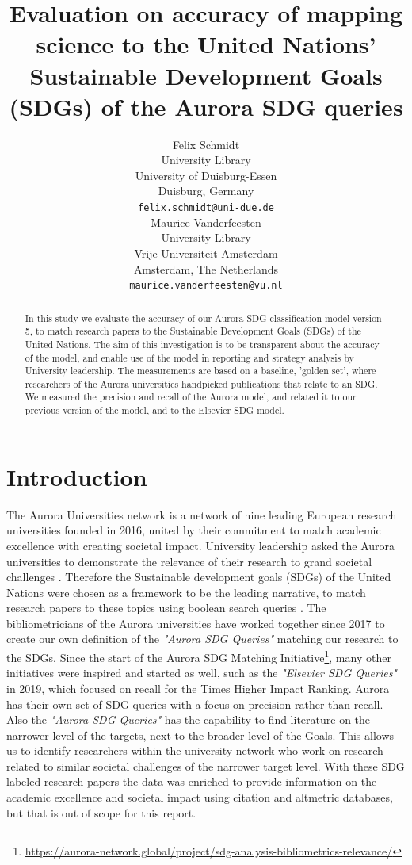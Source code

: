 \documentclass{article}
\title{Evaluation on accuracy of mapping science to the United Nations' Sustainable Development Goals (SDGs) of the Aurora SDG queries}
\author{
  Felix Schmidt \\
  University Library\\
  University of Duisburg-Essen\\
  Duisburg, Germany\\
  \texttt{felix.schmidt@uni-due.de} \\
   \And
Maurice Vanderfeesten \\
  University Library\\
  Vrije Universiteit Amsterdam\\
  Amsterdam, The Netherlands \\
  \texttt{maurice.vanderfeesten@vu.nl} \\
}
\begin{document}
\maketitle

\begin{abstract}
In this study we evaluate the accuracy of our Aurora SDG classification model version 5, to match research papers to the Sustainable Development Goals (SDGs) of the United Nations. The aim of this investigation is to be transparent about the accuracy of the model, and enable use of the model in reporting and strategy analysis by University leadership. The measurements are based on a baseline, 'golden set', where researchers of the Aurora universities handpicked publications that relate to an SDG. We measured the precision and recall of the Aurora model, and related it to our previous version of the model, and to the Elsevier SDG model. 
\end{abstract}




\section{Introduction}
The Aurora Universities network is a network of nine leading European research universities founded in 2016, united by their commitment to match academic excellence with creating societal impact. University leadership asked the Aurora universities to demonstrate the relevance of their research to grand societal challenges \cite{vanderfeesten_societal_2017, drooge_evaluating_2010, carley_social_2019}. Therefore the Sustainable development goals (SDGs) of the United Nations were chosen as a framework to be the leading narrative, to match research papers to these topics using boolean search queries \cite{armitage_mapping_2020}. The bibliometricians of the Aurora universities have worked together since 2017 to create our own definition of the \emph{"Aurora SDG Queries"} matching our research to the SDGs. Since the start of the Aurora SDG Matching Initiative\footnote{\url{https://aurora-network.global/project/sdg-analysis-bibliometrics-relevance/}}, many other initiatives were inspired and started as well, such as the \emph{"Elsevier SDG Queries"} \cite{jayabalasingham_identifying_2019}  in 2019, which focused on recall for the Times Higher Impact Ranking. Aurora has their own set of SDG queries with a focus on precision rather than recall. Also the \emph{"Aurora SDG Queries"} has the capability to find literature on the narrower level of the targets, next to the broader level of the Goals. This allows us to identify researchers within the university network who work on research related to similar societal challenges of the narrower target level.  With these SDG labeled research papers the data was enriched to provide information on the academic excellence and societal impact \cite{bornmann_what_2013} using citation and altmetric databases, but that is out of scope for this report. 
\end{document}
